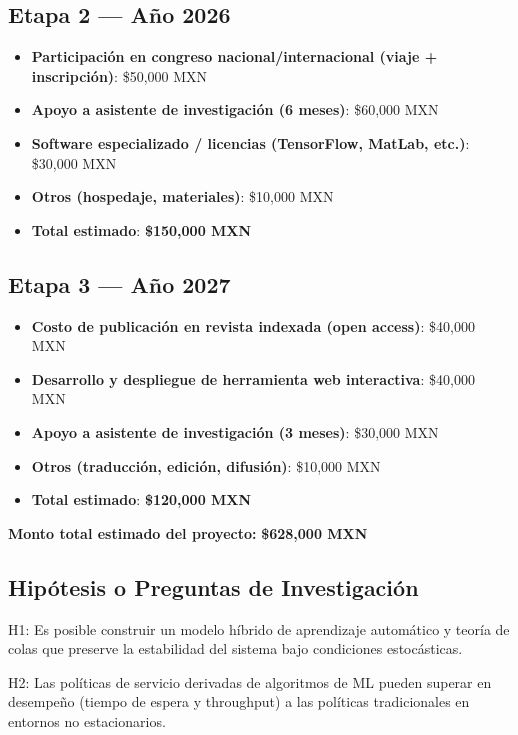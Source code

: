 \documentclass[12pt]{article}
\begin{document}
\subsection*{Etapa 2 — Año 2026}
\begin{itemize}
  \item \textbf{Participación en congreso nacional/internacional (viaje + inscripción)}: \$50,000 MXN
  \item \textbf{Apoyo a asistente de investigación (6 meses)}: \$60,000 MXN
  \item \textbf{Software especializado / licencias (TensorFlow, MatLab, etc.)}: \$30,000 MXN
  \item \textbf{Otros (hospedaje, materiales)}: \$10,000 MXN
  \item \textbf{Total estimado}: \textbf{\$150,000 MXN}
\end{itemize}

\subsection*{Etapa 3 — Año 2027}
\begin{itemize}
  \item \textbf{Costo de publicación en revista indexada (open access)}: \$40,000 MXN
  \item \textbf{Desarrollo y despliegue de herramienta web interactiva}: \$40,000 MXN
  \item \textbf{Apoyo a asistente de investigación (3 meses)}: \$30,000 MXN
  \item \textbf{Otros (traducción, edición, difusión)}: \$10,000 MXN
  \item \textbf{Total estimado}: \textbf{\$120,000 MXN}
\end{itemize}

\textbf{Monto total estimado del proyecto:} \textbf{\$628,000 MXN}



\subsection*{Hipótesis o Preguntas de Investigación}

H1: Es posible construir un modelo híbrido de aprendizaje automático y teoría de colas que preserve la estabilidad del sistema bajo condiciones estocásticas.

H2: Las políticas de servicio derivadas de algoritmos de ML pueden superar en desempeño (tiempo de espera y throughput) a las políticas tradicionales en entornos no estacionarios.
\end{document}
